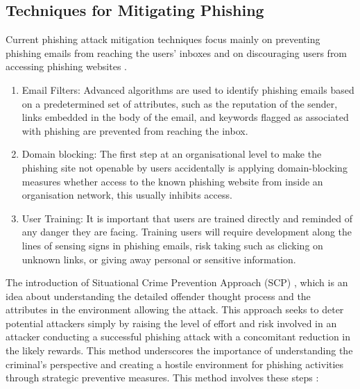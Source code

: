 \subsection{Techniques for Mitigating Phishing}

Current phishing attack mitigation techniques focus mainly on preventing phishing
emails from reaching the users’ inboxes and on discouraging users from accessing
phishing websites \cite{Suzuki2021Phishing}.

\begin{enumerate}
    \item Email Filters: Advanced algorithms are used to identify phishing emails based on a predetermined set of attributes, such as the reputation of the sender, links embedded in the body of the email, and keywords flagged as associated with phishing are prevented from reaching the inbox.
    \item Domain blocking: The first step at an organisational level to make the phishing site not openable by users accidentally is applying domain-blocking measures whether access to the known phishing website from inside an organisation network, this usually inhibits access.
    \item User Training: It is important that users are trained directly and reminded of any danger they are facing. Training users will require development along the lines of sensing signs in phishing emails, risk taking such as clicking on unknown links, or giving away personal or sensitive information.
\end{enumerate}

The introduction of Situational Crime Prevention Approach (SCP) \cite{Suzuki2021Phishing}, which is an idea about understanding the detailed offender thought process and the attributes in the environment allowing the attack. This approach seeks to deter potential attackers simply by raising the level of effort and risk involved in an attacker conducting a successful phishing attack with a concomitant reduction in the likely rewards. This method underscores the importance of understanding the criminal's perspective and creating a hostile environment for phishing activities through strategic preventive measures. This method involves these steps : 

